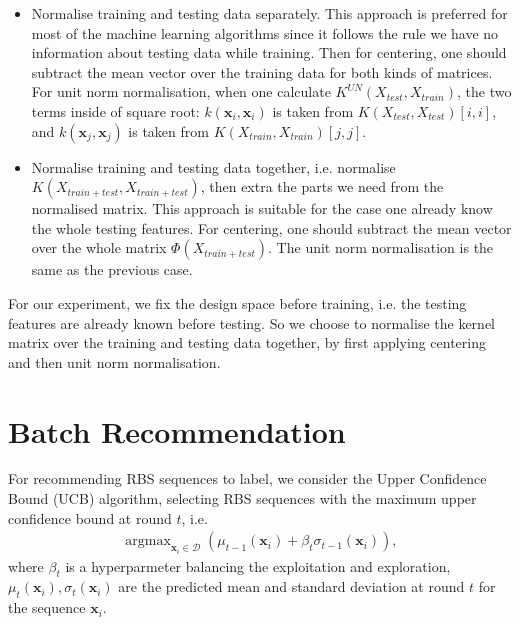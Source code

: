 \begin{itemize}
    \item Normalise training and testing data separately.
    This approach is preferred for most of the machine learning algorithms since it follows the rule we have no information about testing data while training.
    Then for centering, one should subtract the mean vector over the training data for both kinds of matrices.
    For unit norm normalisation, when one calculate $K^{UN}(X_{test}, X_{train})$, the two terms inside of square root: $k(\mathbf{x}_i, \mathbf{x}_i)$ is taken from $K(X_{test}, X_{test})[i,i]$, and $k(\mathbf{x}_j, \mathbf{x}_j)$ is taken from $K(X_{train}, X_{train})[j,j]$.
    
    \item Normalise training and testing data together, i.e. normalise $K(X_{train+test}, X_{train+test})$, then extra the parts we need from the normalised matrix. 
    This approach is suitable for the case one already know the whole testing features. 
    For centering, one should subtract the mean vector over the whole matrix $\Phi(X_{train+test})$. 
    The unit norm normalisation is the same as the previous case. 
\end{itemize}

For our experiment, we fix the design space before training, i.e. the testing features are already known before testing. 
So we choose to normalise the kernel matrix over the training and testing data together,
by first applying centering and then unit norm normalisation. 

\section{Batch Recommendation}

For recommending RBS sequences to label, we consider the Upper Confidence Bound (UCB) algorithm, 
selecting RBS sequences with the maximum upper confidence bound at round $t$, i.e.
\begin{align}
\label{Eq: GPUCB}
    \operatorname{argmax}_{\mathbf{x}_i \in \mathcal{D}} \left( \mu_{t-1}(\mathbf{x}_i) + \beta_t \sigma_{t-1}(\mathbf{x}_i)\right),
\end{align}
where $\beta_t$ is a hyperparmeter balancing the exploitation and exploration, 
$\mu_t(\mathbf{x}_i), \sigma_t(\mathbf{x}_i)$ are the predicted mean and standard deviation at round $t$ for the sequence $\mathbf{x}_i$.

